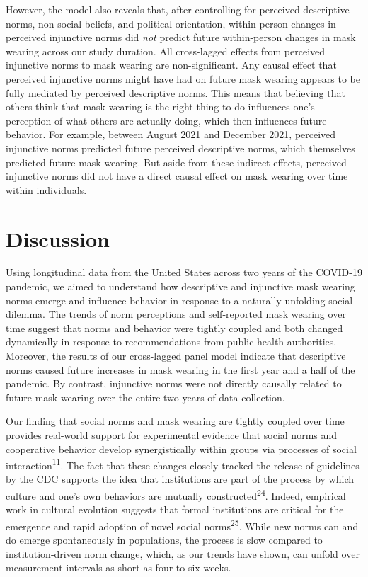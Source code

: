 \documentclass[
  man, donotrepeattitle,floatsintext]{apa6}
\begin{document}
However, the model also reveals that, after controlling for perceived descriptive norms, non-social beliefs, and political orientation, within-person changes in perceived injunctive norms did \emph{not} predict future within-person changes in mask wearing across our study duration. All cross-lagged effects from perceived injunctive norms to mask wearing are non-significant. Any causal effect that perceived injunctive norms might have had on future mask wearing appears to be fully mediated by perceived descriptive norms. This means that believing that others think that mask wearing is the right thing to do influences one's perception of what others are actually doing, which then influences future behavior. For example, between August 2021 and December 2021, perceived injunctive norms predicted future perceived descriptive norms, which themselves predicted future mask wearing. But aside from these indirect effects, perceived injunctive norms did not have a direct causal effect on mask wearing over time within individuals.

\hypertarget{discussion}{%
\section{Discussion}\label{discussion}}

Using longitudinal data from the United States across two years of the COVID-19 pandemic, we aimed to understand how descriptive and injunctive mask wearing norms emerge and influence behavior in response to a naturally unfolding social dilemma. The trends of norm perceptions and self-reported mask wearing over time suggest that norms and behavior were tightly coupled and both changed dynamically in response to recommendations from public health authorities. Moreover, the results of our cross-lagged panel model indicate that descriptive norms caused future increases in mask wearing in the first year and a half of the pandemic. By contrast, injunctive norms were not directly causally related to future mask wearing over the entire two years of data collection.

Our finding that social norms and mask wearing are tightly coupled over time provides real-world support for experimental evidence that social norms and cooperative behavior develop synergistically within groups via processes of social interaction\textsuperscript{11}. The fact that these changes closely tracked the release of guidelines by the CDC supports the idea that institutions are part of the process by which culture and one's own behaviors are mutually constructed\textsuperscript{24}. Indeed, empirical work in cultural evolution suggests that formal institutions are critical for the emergence and rapid adoption of novel social norms\textsuperscript{25}. While new norms can and do emerge spontaneously in populations, the process is slow compared to institution-driven norm change, which, as our trends have shown, can unfold over measurement intervals as short as four to six weeks.
\end{document}
